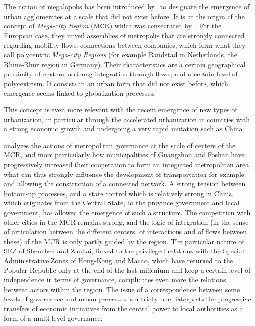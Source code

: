 

The notion of megalopolis has been introduced by~\cite{gottmann1961megalopolis} to designate the emergence of urban agglomerates at a scale that did not exist before. It is at the origin of the concept of \emph{Mega-city Region} (MCR) which was consecrated by~\cite{hall2006polycentric}. For the European case, they unveil assemblies of metropolis that are strongly connected regarding mobility flows, connections between companies, which form what they call polycentric \emph{Mega-city Regions} (for example Randstad in Netherlands, the Rhine-Rhur region in Germany). Their characteristics are a certain geographical proximity of centers, a strong integration through flows, and a certain level of polycentrism. It consists in an urban form that did not exist before, which emergence seems linked to globalization processes.

This concept is even more relevant with the recent emergence of new types of urbanization, in particular through the accelerated urbanization in countries with a strong economic growth and undergoing a very rapid mutation such as China~\cite{swerts2015megacities}.


\cite{Ye2014200} analyzes the actions of metropolitan governance at the scale of centers of the MCR, and more particularly how municipalities of Guangzhou and Foshan have progressively increased their cooperation to form an integrated metropolitan area, what can thus strongly influence the development of transportation for example and allowing the construction of a connected network. A strong tension between bottom-up processes, and a state control which is relatively strong in China, which originates from the Central State, to the province government and local government, has allowed the emergence of such a structure. The competition with other cities in the MCR remains strong, and the logic of integration (in the sense of articulation between the different centers, of interactions and of flows between these) of the MCR is only partly guided by the region. The particular nature of SEZ of Shenzhen and Zhuhai, linked to the privileged relations with the Special Administrative Zones of Hong-Kong and Macao, which have returned to the Popular Republic only at the end of the last millenium and keep a certain level of independence in terms of governance, complicates even more the relations between actors within the region. The issue of a correspondence between some levels of governance and urban processes is a tricky one: \cite{liao2017ouverture} interprets the progressive transfers of economic initiatives from the central power to local authorities as a form of a multi-level governance.



